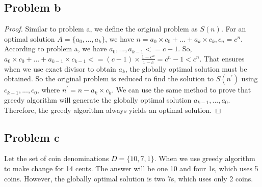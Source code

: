 \documentclass[a4paper]{article}
\newtheorem{proof}{Proof}[section]
\begin{document}
\subsection{Problem b}
\begin{proof}
    Similar to problem a, we define the original problem as $S(n)$. 
    For an optimal solution $A=\{a_0,...,a_k\}$, we have $n = a_0\times c_0+...+a_k\times c_k, c_n = c^{n}$. 
    According to problem a, we have $a_0,...,a_{k-1}<=c-1$. 
    So, $a_0\times c_0+...+a_{k-1}\times c_{k-1}<=(c-1)\times \frac{1-c^{n}}{1-c}=c^{n}-1<c^{n}$.
    That ensures when we use exact divisor to obtain $a_{k}$, the globally optimal solution must be obtained. 
    So the original problem is reduced to find the solution to $S(n^{'})$ using $c_{k-1},...,c_0$, where $n^{'} = n - a_k\times c_k$.
    We can use the same method to prove that greedy algorithm will generate the globally optimal solution $a_{k-1},...,a_0$.
    Therefore, the greedy algorithm always yields an optimal solution.
\end{proof}

\subsection{Problem c}
    Let the set of coin denominations $D = \{10,7,1\}$. 
    When we use greedy algorithm to make change for 14 cents. 
    The answer will be one 10 and four 1s, which uses 5 coins.
    However, the globally optimal solution is two 7s, which uses only 2 coins.
\end{document}
